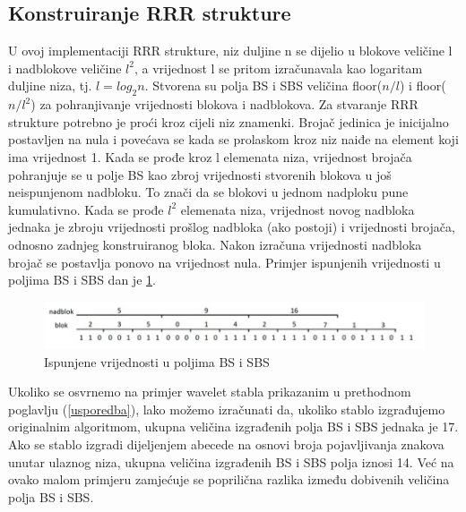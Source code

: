 \subsection{Konstruiranje RRR strukture}
U ovoj implementaciji RRR strukture, niz duljine n se dijelio u blokove veličine l i nadblokove veličine $l^2$, a vrijednost l se pritom izračunavala kao logaritam duljine niza, tj. $l=log_2 n$. Stvorena su polja BS i SBS veličina floor($n/l$) i floor($n/l^{2}$) za pohranjivanje vrijednosti blokova i nadblokova. Za stvaranje RRR strukture potrebno je proći kroz cijeli niz znamenki. Brojač jedinica je inicijalno postavljen na nula i povećava se kada se prolaskom kroz niz naiđe na element koji ima vrijednost 1. Kada se prođe kroz l elemenata niza, vrijednost brojača pohranjuje se u polje BS kao zbroj vrijednosti stvorenih blokova u još neispunjenom nadbloku. To znači da se blokovi u jednom nadploku pune kumulativno. Kada se prođe $l^2$ elemenata niza, vrijednost novog nadbloka jednaka je zbroju vrijednosti prošlog nadbloka (ako postoji) i vrijednosti brojača, odnosno zadnjeg konstruiranog bloka. Nakon izračuna vrijednosti nadbloka brojač se postavlja ponovo na vrijednost nula. Primjer ispunjenih vrijednosti u poljima BS i SBS dan je \ref{rrr1}.

\begin{figure}[H]
\centering
\includegraphics[width=\linewidth]{./pictures/rrr1.jpg}
\caption{Ispunjene vrijednosti u poljima BS i SBS}\label{rrr1}
\end{figure}

Ukoliko se osvrnemo na primjer wavelet stabla prikazanim u prethodnom poglavlju (\ref{usporedba}), lako možemo izračunati da, ukoliko stablo izgrađujemo originalnim algoritmom, ukupna veličina izgrađenih polja BS i SBS jednaka je 17. Ako se stablo izgradi dijeljenjem abecede na osnovi broja pojavljivanja znakova unutar ulaznog niza, ukupna veličina izgrađenih BS i SBS polja iznosi 14. Već na ovako malom primjeru zamjećuje se poprilična razlika između dobivenih veličina polja BS i SBS.


